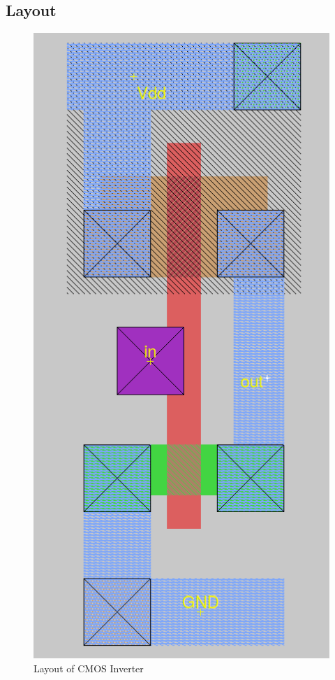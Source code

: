 \documentclass[12pt]{article}
\begin{document}
	\subsection{Layout}
	\begin{figure}[H]
		\begin{center}
			\includegraphics[scale = 0.5]{images/layout.png}
			\caption{Layout of CMOS Inverter}
			\label{fig::cmoslayout}
		\end{center}
	\end{figure}
	
\end{document}
